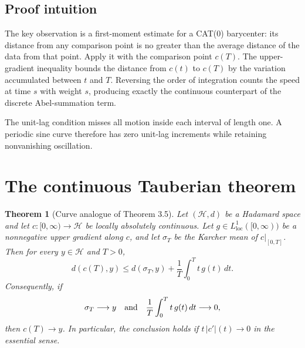 \documentclass[11pt]{article}
\newtheorem{theorem}{Theorem}
\newcommand{\Hh}{\mathcal H}
\begin{document}
\subsection*{Proof intuition}

The key observation is a first-moment estimate for a CAT(0) barycenter:
its distance from any comparison point is no greater than the average
distance of the data from that point.  Apply it with the comparison point
$c(T)$.  The upper-gradient inequality bounds the distance from $c(t)$ to
$c(T)$ by the variation accumulated between $t$ and $T$.  Reversing the
order of integration counts the speed at time $s$ with weight $s$, producing
exactly the continuous counterpart of the discrete Abel-summation term.

The unit-lag condition misses all motion inside each interval of length one.
A periodic sine curve therefore has zero unit-lag increments while retaining
nonvanishing oscillation.

\section{The continuous Tauberian theorem}

\begin{theorem}[Curve analogue of Theorem 3.5]\label{thm:main}
Let $(\Hh,d)$ be a Hadamard space and let
$c:[0,\infty)\to\Hh$ be locally absolutely continuous.  Let
$g\in L^1_{\mathrm{loc}}([0,\infty))$ be a nonnegative upper gradient along
$c$, and let $\sigma_T$ be the Karcher mean of $c|_{[0,T]}$.  Then for every
$y\in\Hh$ and $T>0$,
\begin{equation}\label{eq:quantitative}
 d(c(T),y)\leq d(\sigma_T,y)
 +\frac1T\int_0^T t\,g(t)\,dt.
\end{equation}
Consequently, if
\begin{equation}\label{eq:tauberian}
 \sigma_T\longrightarrow y
 \quad\hbox{and}\quad
 \frac1T\int_0^T t\,g(t)\,dt\longrightarrow0,
\end{equation}
then $c(T)\to y$.  In particular, the conclusion holds if
$t\,|c'|(t)\to0$ in the essential sense.
\end{theorem}
\end{document}
